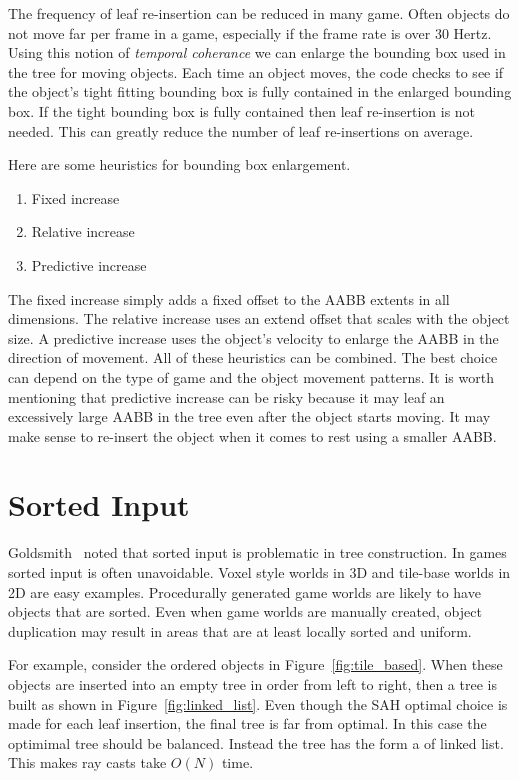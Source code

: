 \documentclass{article}
\begin{document}
The frequency of leaf re-insertion can be reduced in many game. Often objects do not move far per frame in a game, especially if the frame rate is over 30 Hertz. Using this notion of \emph{temporal coherance} we can enlarge the bounding box used in the tree for moving objects. Each time an object moves, the code checks to see if the object's tight fitting bounding box is fully contained in the enlarged bounding box. If the tight bounding box is fully contained then leaf re-insertion is not needed. This can greatly reduce the number of leaf re-insertions on average.

Here are some heuristics for bounding box enlargement.
\begin{enumerate}
	\item Fixed increase
	\item Relative increase
	\item Predictive increase
\end{enumerate}
The fixed increase simply adds a fixed offset to the AABB extents in all dimensions. The relative increase uses an extend offset that scales with the object size. A predictive increase uses the object's velocity to enlarge the AABB in the direction of movement. All of these heuristics can be combined.
The best choice can depend on the type of game and the object movement patterns. It is worth mentioning that predictive increase can be risky because it may leaf an excessively large AABB in the tree even after the object starts moving. It may make sense to re-insert the object when it comes to rest using a smaller AABB.

\section{Sorted Input}
Goldsmith~\cite{Goldsmith1987} noted that sorted input is problematic in tree construction. In games sorted input is often unavoidable. Voxel style worlds in 3D and tile-base worlds in 2D are easy examples. Procedurally generated game worlds are likely to have objects that are sorted. Even when game worlds are manually created, object duplication may result in areas that are at least locally sorted and uniform.

For example, consider the ordered objects in Figure~\ref{fig:tile_based}. When these objects are inserted into an empty tree in order from left to right, then a tree is built as shown in Figure~\ref{fig:linked_list}. Even though the SAH optimal choice is made for each leaf insertion, the final tree is far from optimal. In this case the optimimal tree should be balanced. Instead the tree has the form a of linked list. This makes ray casts take $O(N)$ time.
\end{document}
